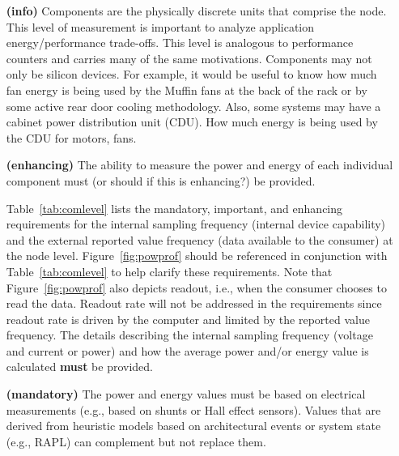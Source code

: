 \begin{itemize}

\item[\textbf{(info)}]
Components are the physically discrete units that comprise the node. This level of measurement 
is important to analyze application energy/performance trade-offs. This level is analogous 
to performance counters and carries many of the same motivations.  Components may not 
only be silicon devices.  For example, it would be useful to know how much fan energy is 
being used by the Muffin fans at the back of the rack or by some active rear door cooling 
methodology.  Also, some systems may have a cabinet power distribution unit (CDU).  How 
much energy is being used by the CDU for motors, fans.
	
\item[\textbf{(enhancing)}]
The ability to measure the power and energy of each individual component must 
(or should if this is enhancing?) be provided.
	
Table~\ref{tab:comlevel} lists the mandatory, important, and enhancing requirements for 
the internal sampling frequency (internal device capability) and the external reported value 
frequency (data available to the consumer) at the node level. Figure~\ref{fig:powprof} should 
be referenced in conjunction with Table~\ref{tab:comlevel} to help clarify these requirements. 
Note that Figure~\ref{fig:powprof} also depicts readout, i.e., when the consumer chooses to 
read the data. Readout rate will not be addressed in the requirements since readout rate 
is driven by the computer and limited by the reported value frequency. The details describing 
the internal sampling frequency (voltage and current or power) and how the average 
power and/or energy value is calculated \textbf{must} be provided.

\item[\textbf{(mandatory)}]
The power and energy values must be based on electrical measurements (e.g., based on 
shunts or Hall effect sensors). Values that are derived from heuristic models based 
on architectural events or system state (e.g., RAPL) can complement but not replace them.
\end{itemize}



